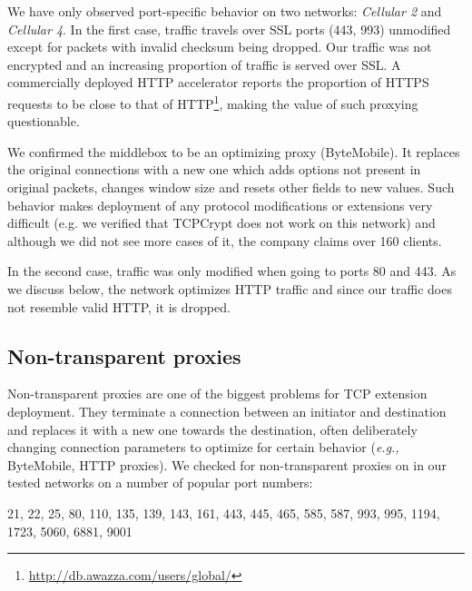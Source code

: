 \documentclass{sig-alternate-10pt}
\providecommand{\eg}{\emph{e.g.,} }
\begin{document}
We have only observed port-specific behavior on two networks: \emph{Cellular 2} and \emph{Cellular 4}. In the first case, traffic travels over SSL ports (443, 993) unmodified except for packets with invalid checksum being dropped. Our traffic was not encrypted and an increasing proportion of traffic is served over SSL. A commercially deployed HTTP accelerator reports the proportion of HTTPS requests to be close to that of HTTP\footnote{\url{http://db.awazza.com/users/global/}}, making the value of such proxying questionable.

We confirmed the middlebox to be an optimizing proxy (ByteMobile). It replaces the original connections with a new one which adds options not present in original packets, changes window size and resets other fields to new values. Such behavior makes deployment of any protocol modifications or extensions very difficult (e.g. we verified that TCPCrypt does not work on this network) and although we did not see more cases of it, the company claims over 160 clients.

In the second case, traffic was only modified when going to ports 80 and 443. As we discuss below, the network optimizes HTTP traffic and since our traffic does not resemble valid HTTP, it is dropped.

\subsection{Non-transparent proxies}
\label{sec:proxies}

Non-transparent proxies are one of the biggest problems for TCP extension deployment. They terminate a connection between an initiator and destination and replaces it with a new one towards the destination, often deliberately changing connection parameters to optimize for certain behavior (\eg ByteMobile, HTTP proxies). We checked for non-transparent proxies on in our tested networks on a number of popular port numbers:

21, 22, 25, 80, 110,
  135,
  139,
  143,
  161,
  443,
  445,
  465,
  585,
  587,
  993,
  995,
 1194,
 1723,
 5060,
 6881,
 9001
\end{document}

